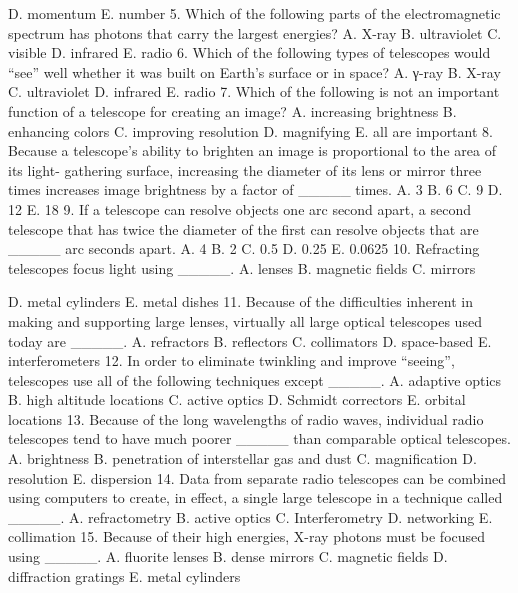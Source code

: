 D. momentum
E. number
5. Which of the following parts of the electromagnetic spectrum has photons that carry the
largest energies?
A. X-ray
B. ultraviolet
C. visible
D. infrared
E. radio
6. Which of the following types of telescopes would “see” well whether it was built on Earth’s
surface or in space?
A. γ-ray
B. X-ray
C. ultraviolet
D. infrared
E. radio
7. Which of the following is not an important function of a telescope for creating an image?
A. increasing brightness
B. enhancing colors
C. improving resolution
D. magnifying
E. all are important
8. Because a telescope’s ability to brighten an image is proportional to the area of its light-
gathering surface, increasing the diameter of its lens or mirror three times increases image
brightness by a factor of _____ times.
A. 3
B. 6
C. 9
D. 12
E. 18
9. If a telescope can resolve objects one arc second apart, a second telescope that has twice
the diameter of the first can resolve objects that are _____ arc seconds apart.
A. 4
B. 2
C. 0.5
D. 0.25
E. 0.0625
10. Refracting telescopes focus light using _____.
A. lenses
B. magnetic fields
C. mirrors


D. metal cylinders
E. metal dishes
11. Because of the difficulties inherent in making and supporting large lenses, virtually all large
optical telescopes used today are _____.
A. refractors
B. reflectors
C. collimators
D. space-based
E. interferometers
12. In order to eliminate twinkling and improve “seeing”, telescopes use all of the following
techniques except _____.
A. adaptive optics
B. high altitude locations
C. active optics
D. Schmidt correctors
E. orbital locations
13. Because of the long wavelengths of radio waves, individual radio telescopes tend to have
much poorer _____ than comparable optical telescopes.
A. brightness
B. penetration of interstellar gas and dust
C. magnification
D. resolution
E. dispersion
14. Data from separate radio telescopes can be combined using computers to create, in effect,
a single large telescope in a technique called _____.
A. refractometry
B. active optics
C. Interferometry
D. networking
E. collimation
15. Because of their high energies, X-ray photons must be focused using _____.
A. fluorite lenses
B. dense mirrors
C. magnetic fields
D. diffraction gratings
E. metal cylinders


\endinput



